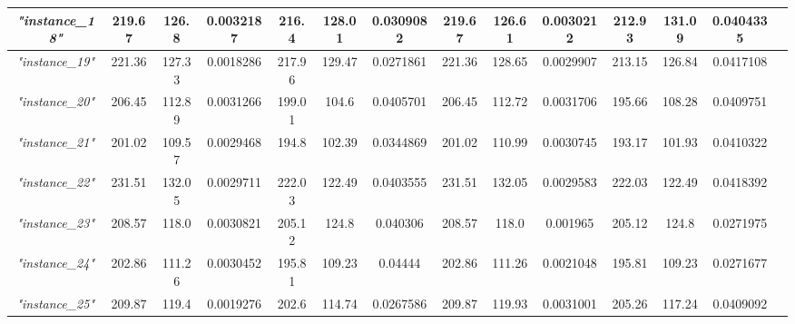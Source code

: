 \documentclass{article}
\begin{document}
\begin{table}[H]
{\begin{tabular}{|c||c|c|c|c|c|c|c|c|c|c|c|c|c|}
\hline
\textit{"instance\_18"} & 219.67 & 126.8 & 0.0032187 & 216.4 & 128.01 & 0.0309082  & 219.67 & 126.61 & 0.0030212 & 212.93 & 131.09 & 0.0404335 \\
\hline
\textit{"instance\_19"} & 221.36 & 127.33 & 0.0018286 & 217.96 & 129.47 & 0.0271861  & 221.36 & 128.65 & 0.0029907 & 213.15 & 126.84 & 0.0417108 \\
\hline
\textit{"instance\_20"} & 206.45 & 112.89 & 0.0031266 & 199.01 & 104.6 & 0.0405701  & 206.45 & 112.72 & 0.0031706 & 195.66 & 108.28 & 0.0409751 \\
\hline
\textit{"instance\_21"} & 201.02 & 109.57 & 0.0029468 & 194.8 & 102.39 & 0.0344869  & 201.02 & 110.99 & 0.0030745 & 193.17 & 101.93 & 0.0410322 \\
\hline
\textit{"instance\_22"} & 231.51 & 132.05 & 0.0029711 & 222.03 & 122.49 & 0.0403555  & 231.51 & 132.05 & 0.0029583 & 222.03 & 122.49 & 0.0418392 \\
\hline
\textit{"instance\_23"} & 208.57 & 118.0 & 0.0030821 & 205.12 & 124.8 & 0.040306  & 208.57 & 118.0 & 0.001965 & 205.12 & 124.8 & 0.0271975 \\
\hline
\textit{"instance\_24"} & 202.86 & 111.26 & 0.0030452 & 195.81 & 109.23 & 0.04444  & 202.86 & 111.26 & 0.0021048 & 195.81 & 109.23 & 0.0271677 \\
\hline
\textit{"instance\_25"} & 209.87 & 119.4 & 0.0019276 & 202.6 & 114.74 & 0.0267586  & 209.87 & 119.93 & 0.0031001 & 205.26 & 117.24 & 0.0409092 \\
\hline
\end{tabular}}
\end{table}
\end{document}
